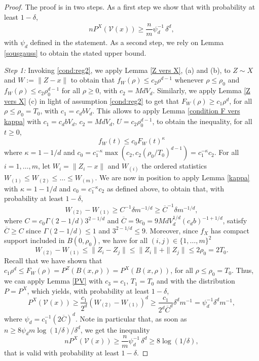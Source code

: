 \documentclass[paper=a4, fontsize=11pt]{scrartcl}
\newcommand{\PP}{\mathbb{P}}
\begin{document}
\begin{proof}
The proof is in two steps. As a first step we show that with probability at least $1-\delta$,
\begin{align*}
n  P^X (\mathcal{V}(x) ) \geq \dfrac{n}{m} \psi_d^{-1} \, \delta^d   ,
\end{align*}
with \( \psi_d \) defined in the statement.
As a second step, we rely on Lemma \ref{sousgauss} to obtain the stated upper bound. 

\noindent \textit{Step 1:} Invoking \ref{cond:reg2}, we apply Lemma \ref{Z vers X}, (a) and (b),  to $Z \sim X$ and $W := \|Z - x\|$
 to obtain that $f_W(\rho) \leq c_2 \rho^{d-1} $ whenever $\rho\leq \rho_0$ and $f_W (\rho ) \leq c_2 \rho_0^ {d-1} $ for all $\rho \geq 0$, with $c_2 = Md V_d$. Similarly, we apply Lemma \ref{Z vers X} (c) in light of assumption \ref{cond:reg2} to get that $ F_W(\rho) \geq c_1 \rho ^d$, for all $\rho \leq \rho_0 = T_0$, with $c_1 = c_d b V_d$. This allows to  apply Lemma \ref{condition F vers kappa} with \( c_1 = c_d b V_d\), \(c_2 = Md V_d\), \(U = c_2 \rho_0^{d-1} \), to obtain the inequality, for all $t\geq 0$,
\[
f_W(t) \leq c_0 F_W(t)^\kappa
\]  
where \( \kappa = 1 - 1/d \) and $ c_0 =  c_1^{-\kappa} \max(c_2,  c_2 {(\rho_0/T_0)^{d-1}}) = c_1^{-\kappa} c_2 $. For all $i=1,\ldots, m$, let $ W_i =\| Z_i - x\| $ and $W_{(i)} $ the ordered statistics $ W_{(1)} \leq W_{(2)} \leq  \ldots \leq   W_{(m)}.$ 
We are now in position to apply Lemma \ref{kappa} with \( \kappa = 1 - 1/d \) and  $ c_0 = c_1^{-\kappa} c_2 $ as defined above, to obtain that, with probability at least \(1 - \delta\), 
$$W_{(2)} -W_{(1)}  \geq    C^{-1} \delta  m^{ -1/d } \geq \overline{C}^{-1} \delta  m^{ -1/d } ,$$ where $C = c_0 \Gamma(2-1/d) 3^{2-1/d}$ and   $\overline{C}= 9 c_0 = 9Md V_d^{1/d} {(c_d b)^{-1+1/d}}  $,  satisfy $\overline{C} \geq C$ since \( \Gamma(2-1/d)  \leq 1 \) and $3^{2-1/d}\leq 9 $. Moreover, since \( f_X \) has compact support included in $B (0, \rho_0)$, we have for all $(i,j) \in \{1, \dots, m\}^2$ 
\[  W_{(2)} -  W_{(1)}  \leq \| Z_i - Z_j \| \leq \|Z_i\| + \| Z_j\| \leq 2 \rho_0 = 2T_0.\]  
Recall that we have shown that $ c_1 \rho ^d \leq  F_W(\rho) = P^Z(B(x,\rho)) = P^X(B(x,\rho))$, for all $\rho \leq \rho_0 = T_0$. Thus, we can apply Lemma \ref{PV} with $c_3 = c_1$, \( T_1 = T_0 \) and with the distribution $P = P^X$, which yields, with probability at least $1-\delta$,
\[
 P^X(\mathcal{V}(x) )\geq \frac{c_1}{2^d}   (W_{(2)} -  W_{(1)}) ^d \geq \frac{c_1}{2^d \overline{C}^{d}}  \delta^d  m^{ -1 }= \psi_d^{-1} \delta^d  m^{ -1 },
\]  
where %
\( \psi_d =  c_1^{-1} (2\overline{C})^{d} \). 
Note in particular that, as soon as \( n\geq 8\psi_dm\log(1/\delta)/ \delta^d \), we get the inequality  
\[
n P^X(\mathcal{V}(x) ) \geq \dfrac{n}{m} \psi_d^{-1} \, \delta^d \geq 8\log(1/\delta),
\]  
that is valid with probability at least $1-\delta$. 


\end{proof}
\end{document}
